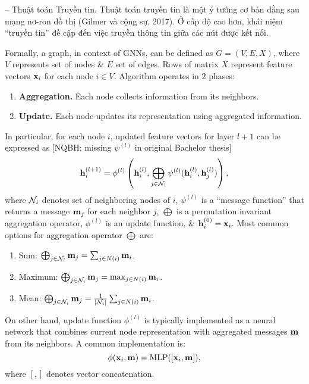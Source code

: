\documentclass{article}
\begin{document}
\begin{itemize}
\begin{itemize}
        -- {\sf Thuật toán Truyền tin.} Thuật toán truyền tin là một ý tưởng cơ bản đằng sau mạng nơ-ron đồ thị (Gilmer và cộng sự, 2017). Ở cấp độ cao hơn, khái niệm ``truyền tin'' đề cập đến việc truyền thông tin giữa các nút được kết nối.

        Formally, a graph, in context of GNNs, can be defined as $G = (V,E,X)$, where $V$ represents set of nodes \& $E$ set of edges. Rows of matrix $X$ represent feature vectors ${\bf x}_i$ for each node $i\in V$. Algorithm operates in 2 phases:
        \begin{enumerate}
            \item {\bf Aggregation.} Each node collects information from its neighbors.
            \item {\bf Update.} Each node updates its representation using aggregated information.
        \end{enumerate}
        In particular, for each node $i$, updated feature vectors for layer $l + 1$ can be expressed as [NQBH: missing $\psi^{(l)}$ in original Bachelor thesis]
        \begin{equation*}
            {\bf h}_i^{(l + 1)} = \phi^{(l)}\left({\bf h}_i^{(l)},\bigoplus_{j\in{\cal N}_i} \psi^{(l)}({\bf h}_i^{(l)},{\bf h}_j^{(l)})\right),
        \end{equation*}
        where ${\cal N}_i$ denotes set of neighboring nodes of $i$, $\psi^{(l)}$ is a ``message function'' that returns a message ${\bf m}_j$ for each neighbor $j$, $\bigoplus$ is a permutation invariant aggregation operator, $\phi^{(l)}$ is an update function, \& ${\bf h}_i^{(0)} = {\bf x}_i$. Most common options for aggregation operator $\bigoplus$ are:
        \begin{enumerate}
            \item Sum: $\bigoplus_{j\in{\cal N}_i} {\bf m}_j = \sum_{j\in N(i)} {\bf m}_i$.
            \item Maximum: $\bigoplus_{j\in{\cal N}_i} {\bf m}_j = \max_{j\in N(i)} {\bf m}_i$.
            \item Mean: $\bigoplus_{j\in{\cal N}_i} {\bf m}_j = \frac{1}{|{\cal N}_i|}\sum_{j\in N(i)} {\bf m}_i$.
        \end{enumerate}
        On other hand, update function $\phi^{(l)}$ is typically implemented as a neural network that combines current node representation with aggregated messages ${\bf m}$ from its neighbors. A common implementation is:
        \begin{equation*}
            \phi({\bf x}_i,{\bf m}) = {\rm MLP}([{\bf x}_i,{\bf m}]),
        \end{equation*}
        where $[,]$ denotes vector concatenation.


\end{itemize}
\end{itemize}
\end{document}
